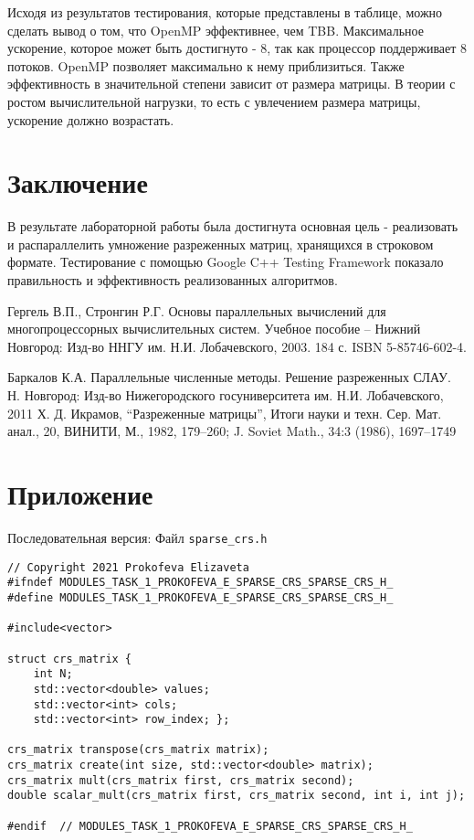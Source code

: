 \documentclass{report}
\begin{document}
\par Исходя из результатов тестирования, которые представлены в таблице, можно сделать вывод о том, что OpenMP эффективнее, чем TBB. Максимальное ускорение, которое может быть достигнуто - 8, так как процессор поддерживает 8 потоков. OpenMP позволяет максимально к нему приблизиться. Также эффективность в значительной степени зависит от размера матрицы. В теории с ростом вычислительной нагрузки, то есть с увлечением размера матрицы, ускорение должно возрастать.
\newpage
\section* {Заключение}
В результате лабораторной работы была достигнута основная цель - реализовать и распараллелить умножение разреженных матриц, хранящихся в строковом формате. Тестирование с помощью Google C++ Testing Framework показало правильность и эффективность реализованных алгоритмов.
\newpage
{}
\begin{thebibliography}{1}
		 Гергель В.П., Стронгин Р.Г. Основы параллельных вычислений для многопроцессорных вычислительных систем. Учебное пособие – Нижний Новгород: Изд-во ННГУ им. Н.И. Лобачевского, 2003. 184 с. ISBN 5-85746-602-4.

		Баркалов К.А. Параллельные численные методы. Решение разреженных СЛАУ. Н. Новгород: Изд-во Нижегородского госуниверситета им. Н.И. Лобачевского, 2011
		Х. Д. Икрамов, “Разреженные матрицы”, Итоги науки и техн. Сер. Мат. анал., 20, ВИНИТИ, М., 1982, 179–260; J. Soviet Math., 34:3 (1986), 1697–1749

	\end{thebibliography}
\newpage
\section*{Приложение}
Последовательная версия:
\newline Файл \verb|sparse_crs.h|
\begin{lstlisting}
// Copyright 2021 Prokofeva Elizaveta
#ifndef MODULES_TASK_1_PROKOFEVA_E_SPARSE_CRS_SPARSE_CRS_H_
#define MODULES_TASK_1_PROKOFEVA_E_SPARSE_CRS_SPARSE_CRS_H_

#include<vector>

struct crs_matrix {
    int N;
    std::vector<double> values;
    std::vector<int> cols;
    std::vector<int> row_index; };

crs_matrix transpose(crs_matrix matrix);
crs_matrix create(int size, std::vector<double> matrix);
crs_matrix mult(crs_matrix first, crs_matrix second);
double scalar_mult(crs_matrix first, crs_matrix second, int i, int j);

#endif  // MODULES_TASK_1_PROKOFEVA_E_SPARSE_CRS_SPARSE_CRS_H_
\end{lstlisting}
 
\end{document}
